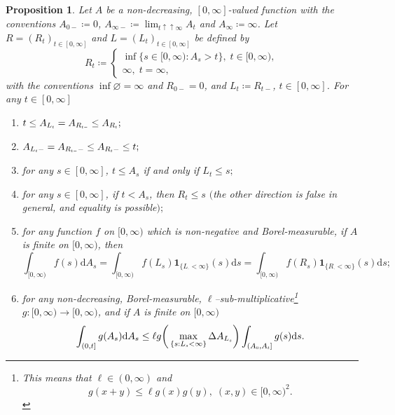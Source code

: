 \documentclass[10pt]{article} %
\newtheorem{proposition}[theorem]{Proposition}
\newcommand{\smalltext}[1]{\text{\fontsize{4}{4}\selectfont$#1$}}
\newcommand{\1}{\mathbf{1}}
\def\d{\mathrm{d}}
\begin{document}
\begin{proposition}\label{lem::leb_stj}
	Let $A$ be a non-decreasing, $[0,\infty]$-valued function with the conventions $A_{0-} \coloneqq 0$, $A_{\infty-} \coloneqq \lim_{t \uparrow\uparrow \infty} A_t$ and $A_\infty \coloneqq \infty$.  Let $R = (R_t)_{t\in[0,\infty]}$ and $L = (L_t)_{t\in[0,\infty]}$ be defined by
		\begin{equation*}
			R_t \coloneqq 
			\begin{cases}
				\inf\{ s \in [0,\infty) : A_s > t\}, \; t \in [0,\infty), \\
				\infty, \; t = \infty, 
			\end{cases}
		\end{equation*}
		with the conventions $\inf \varnothing = \infty$ and $R_{0-} = 0$, and $L_t \coloneqq R_{t-}$, $t\in[0,\infty]$. For any $t\in [0,\infty]$
		\begin{enumerate}
			\item[$(i)$] $t \leq A_{L_\smalltext{t}} = A_{R_{\smalltext{t}\smalltext{-}}} \leq A_{R_\smalltext{t}};$
			\item[$(ii)$] $A_{L_\smalltext{t}-} = A_{R_{\smalltext{t}\smalltext{-}}-} \leq A_{R_{\smalltext{t}}-} \leq t;$
			\item[$(iii)$] for any $s\in[0,\infty]$, $t \leq A_s$ if and only if $L_t \leq s;$
			\item[$(iv)$] for any $s\in[0,\infty]$, if $t < A_s$, then $R_t \leq s$ $($the other direction is false in general, and equality is possible$);$
			\item [$(v)$] for any function $f$ on $[0,\infty)$ which is non-negative and Borel-measurable, if $A$ is finite on $[0,\infty)$, then
			\begin{equation*}
				\int_{[0,\infty)} f(s) \d A_s = \int_{[0,\infty)} f(L_s) \mathbf{1}_{\{L_\cdot < \infty\}}(s) \d s = \int_{[0,\infty)} f(R_s) \mathbf{1}_{\{R_\cdot < \infty\}}(s) \d s;
			\end{equation*}
			\item[$(vi)$] for any non-decreasing, Borel-measurable, $\ell$--sub-multiplicative\footnote{This means that $\ell \in (0,\infty)$ and
				\begin{equation*}
					g(x+y) \leq \ell g(x)g(y),\; (x,y) \in [0,\infty)^2.
				\end{equation*}} $g : [0,\infty) \longrightarrow [0,\infty)$, and if $A$ is finite on $[0,\infty)$
				\begin{equation*}
					\int_{(0,t]} g(A_s) \d A_s \leq \ell g\bigg( \max_{\{s : L_\smalltext{s} < \infty\}} \Delta A_{L_\smalltext{s}} \bigg) \int_{(A_\smalltext{0}, A_\smalltext{t}]} g(s) \d s.
				\end{equation*}
		\end{enumerate}
\end{proposition}
\end{document}
